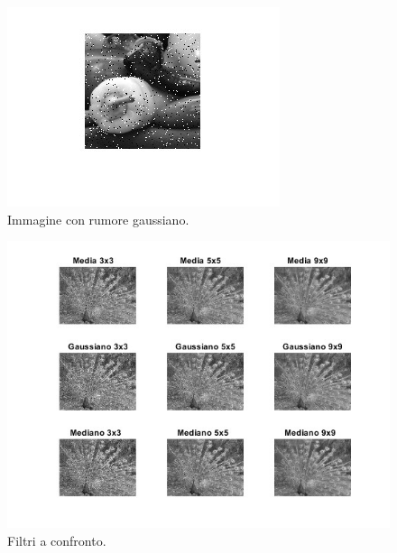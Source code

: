 \documentclass[a4paper]{article}
\begin{document}
	\begin{figure}[!htp]
		\centering
		\includegraphics[width=\textwidth]{img/lab/operato-locali-4.jpg}
		\caption{Immagine con rumore gaussiano.}
	\end{figure}
	\begin{figure}[!htp]
		\centering
		\includegraphics[width=\textwidth]{img/lab/operato-locali-5.jpg}
		\caption{Filtri a confronto.}
	\end{figure}\newpage
	
\end{document}
